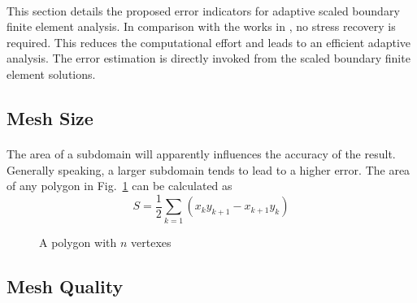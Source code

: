 \paragraph{}
This section details the proposed error indicators for adaptive scaled boundary finite element analysis.
In comparison with the works in \cite{NME:NME439}, no stress recovery is required.
This reduces the computational effort and leads to an efficient adaptive analysis.
The error estimation is directly invoked from the scaled boundary finite element solutions.

\subsection{Mesh Size}
\paragraph{}
The area of a subdomain will apparently influences the accuracy of the result.
Generally speaking, a larger subdomain tends to lead to a higher error.
The area of any polygon in Fig.~\ref{adap_fig:ei_polygon} can be calculated as 
%
\begin{equation}
    S = \frac{1}{2}
        \sum_{k=1}
        \left(
            x_k y_{k+1} - x_{k+1} y_k
        \right)
\end{equation}
%
\begin{figure}[h!]
    \centering
    \caption{A polygon with $n$ vertexes}
    \label{adap_fig:ei_polygon}
\end{figure}
%
\subsection{Mesh Quality}
